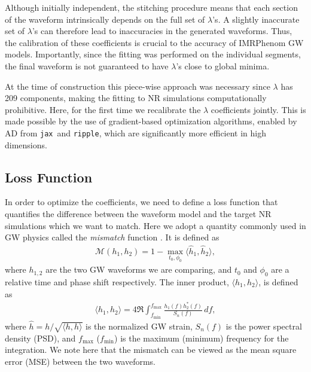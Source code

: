 \documentclass[twocolumn]{aastex631}
\newcommand{\ripple}{\texttt{ripple}}
\newcommand{\jax}{\texttt{jax}}
\newcommand{\kw}[1]{{\color{rb4}[KW: #1 ]}}
\begin{document}
Although initially independent, the stitching procedure means that each section
of the waveform intrinsically depends on the full set of $\lambda$'s. 
A slightly inaccurate set of $\lambda$'s can therefore lead to inaccuracies in
the generated waveforms. 
Thus, the calibration of these coefficients is crucial to the accuracy
of IMRPhenom GW models. 
Importantly, since the fitting was performed on the individual segments,
the final waveform is not guaranteed to have $\lambda$'s close to global minima.

At the time of construction this piece-wise approach was necessary since
$\lambda$ has 209 components, making the fitting to NR simulations computationally prohibitive.
Here, for the first time we recalibrate the $\lambda$ coefficients jointly. 
This is made possible by the use of gradient-based optimization algorithms,
enabled by AD from \jax\, and {\ripple}, which are significantly more efficient in high dimensions.  

\subsection{Loss Function} \label{subsec:loss}

In order to optimize the coefficients, we need to define a loss function that
quantifies the difference between the waveform model and the target NR simulations which we want to match.
Here we adopt a quantity commonly used in GW physics called the \textit{mismatch} function \citep{owen1996search, husa2016frequency}. 
It is defined as
\begin{align} \label{eq:mismatch}
	\mathcal{M}(h_1, h_2)=1-\max_{t_0, \phi_0}\langle \hat{h}_1, \hat{h}_2\rangle,
\end{align}
where $h_{1,2}$ are the two GW waveforms we are comparing, and $t_0$ and $\phi_0$
are a relative time and phase shift respectively. 
The inner product, $\langle h_1, h_2 \rangle$, is defined as 
\begin{align}\label{eq:inner_prod}
	\langle h_1, h_2 \rangle = 4\Re\int_{f_{\mathrm{min}}}^{f_{\mathrm{max}}}\frac{h_1(f)h_2^{\ast}(f)}{S_n(f)}\,df,
\end{align}
where $\hat{h}=h/\sqrt{\langle h, h \rangle}$ is the normalized GW strain,
$S_n(f)$ is the power spectral density (PSD), and $f_{\mathrm{max}}$ ($f_{\mathrm{min}}$) is
the maximum (minimum) frequency for the integration.
We note here that the mismatch can be viewed as the mean square error (MSE) between the
two waveforms.
\end{document}
